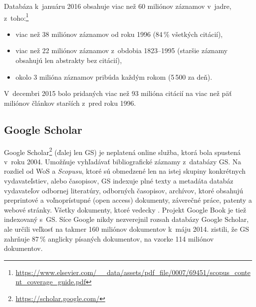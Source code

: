 Databáza k~januáru 2016 obsahuje viac než 60 miliónov záznamov v~jadre,
z~toho:\footnote{\url{https://www.elsevier.com/__data/assets/pdf_file/0007/69451/scopus_content_coverage_guide.pdf}}

\begin{itemize}
\item viac než 38 miliónov záznamov od roku 1996 (84\,\% všetkých citácií),
\item viac než 22 miliónov záznamov z~obdobia 1823--1995 (staršie záznamy
  obsahujú len abstrakty bez citácií),
\item okolo 3 milióna záznamov pribúda každým rokom (5\,500 za deň).
\end{itemize}

V~decembri 2015 bolo pridaných viac než 93 milióna citácií na viac než päť
miliónov článkov starších z~pred roku 1996.

\subsection{Google Scholar}
\label{sec:gs}

Google Scholar\footnote{\url{https://scholar.google.com/}} (ďalej len GS) je
neplatená online služba, ktorá bola spustená v~roku 2004.  Umožňuje vyhľadávať
bibliografické záznamy z~databázy GS.  Na rozdiel od WoS a \emph{Scopusu}, ktoré
sú obmedzené len na istej skupiny konkrétnych vydavateľstiev, alebo časopisov,
GS indexuje plné texty a metadáta databáz vydavateľov odbornej literatúry,
odborných časopisov, archívov, ktoré obsahujú preprintové a voľnoprístupné (open
access) dokumenty, záverečné práce, patenty a webové stránky.  Všetky dokumenty,
ktoré  vedecky \citep{Vine2006}.  Projekt Google Book je tiež
indexovaný s~GS.  Síce Google nikdy nezverejnil rozsah databázy Google Scholar,
ale \citet{Orduna-Malea2015} určili veľkosť na takmer 160 miliónov dokumentov
k~máju 2014.  \citet{Khabsa2014} zistili, že GS zahrňuje 87\,\% anglicky
písaných dokumentov, na vzorke 114 miliónov dokumentov.

